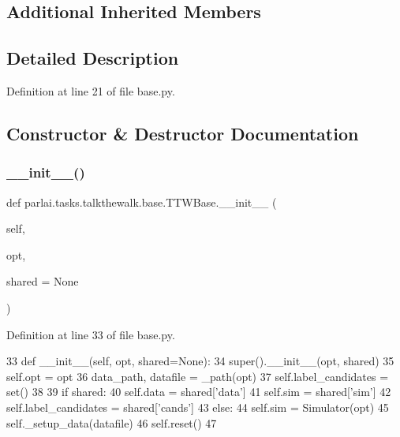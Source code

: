\subsection*{Additional Inherited Members}


\subsection{Detailed Description}


Definition at line 21 of file base.\+py.



\subsection{Constructor \& Destructor Documentation}
\mbox{\label{classparlai_1_1tasks_1_1talkthewalk_1_1base_1_1TTWBase_abde7fa2ca98467601795e5873285d8a0}} 
\subsubsection{\texorpdfstring{\+\_\+\+\_\+init\+\_\+\+\_\+()}{\_\_init\_\_()}}
{\footnotesize\ttfamily def parlai.\+tasks.\+talkthewalk.\+base.\+T\+T\+W\+Base.\+\_\+\+\_\+init\+\_\+\+\_\+ (\begin{DoxyParamCaption}\item[{}]{self,  }\item[{}]{opt,  }\item[{}]{shared = {\ttfamily None} }\end{DoxyParamCaption})}



Definition at line 33 of file base.\+py.


\begin{DoxyCode}
33     \textcolor{keyword}{def }\_\_init\_\_(self, opt, shared=None):
34         super().\_\_init\_\_(opt, shared)
35         self.opt = opt
36         data\_path, datafile = \_path(opt)
37         self.label\_candidates = set()
38 
39         \textcolor{keywordflow}{if} shared:
40             self.data = shared[\textcolor{stringliteral}{'data'}]
41             self.sim = shared[\textcolor{stringliteral}{'sim'}]
42             self.label\_candidates = shared[\textcolor{stringliteral}{'cands'}]
43         \textcolor{keywordflow}{else}:
44             self.sim = Simulator(opt)
45             self.\_setup\_data(datafile)
46         self.reset()
47 
\end{DoxyCode}


